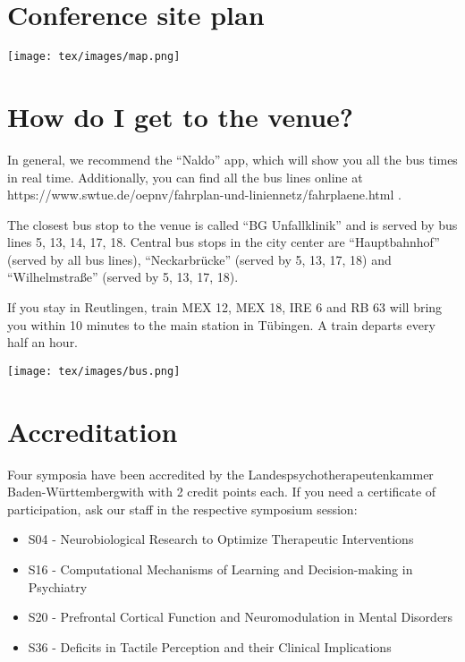 
\setlength{\parskip}{1em}   

\section*{Conference site plan}

\begin{center}
\texttt{[image: tex/images/map.png]}
\end{center}


\section*{How do I get to the venue?}

In general, we recommend the “Naldo” app, which will show you all the bus times in real time. Additionally, you can find all the bus lines online at https://www.swtue.de/oepnv/fahrplan-und-liniennetz/fahrplaene.html .

The closest bus stop to the venue is called “BG Unfallklinik” and is served by bus lines 5, 13, 14, 17, 18. Central bus stops in the city center are “Hauptbahnhof” (served by all bus lines), “Neckarbrücke” (served by 5, 13, 17, 18) and “Wilhelmstraße” (served by 5, 13, 17, 18).

If you stay in Reutlingen, train MEX 12, MEX 18, IRE 6 and RB 63 will bring you within 10 minutes to the main station in Tübingen. A train departs every half an hour.

\vspace*{-1cm}

\begin{center}
\texttt{[image: tex/images/bus.png]}
\end{center}

\section*{Accreditation}

Four symposia have been accredited by the Landespsychotherapeutenkammer Baden-Württembergwith with 2 credit points each. If you need a certificate of participation, ask our staff in the respective symposium session: 

\begin{itemize}
\setlength{\itemsep}{-0.8em} 
	\item S04 - Neurobiological Research to Optimize Therapeutic Interventions
	\item S16 - Computational Mechanisms of Learning and Decision-making in Psychiatry
	\item S20 - Prefrontal Cortical Function and Neuromodulation in Mental Disorders
	\item S36 - Deficits in Tactile Perception and their Clinical Implications
\end{itemize}

